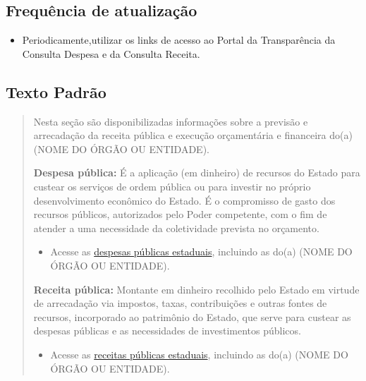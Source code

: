\documentclass[
]{book}
\providecommand{\tightlist}{%
  \setlength{\itemsep}{0pt}\setlength{\parskip}{0pt}}
\begin{document}
\hypertarget{frequuxeancia-de-atualizauxe7uxe3o-4}{%
\subsection{Frequência de atualização}\label{frequuxeancia-de-atualizauxe7uxe3o-4}}

\begin{itemize}
\tightlist
\item
  Periodicamente,utilizar os links de acesso ao Portal da Transparência da Consulta Despesa e da Consulta Receita.
\end{itemize}

\hypertarget{texto-padruxe3o-5}{%
\subsection{Texto Padrão}\label{texto-padruxe3o-5}}

\begin{quote}
Nesta seção são disponibilizadas informações sobre a previsão e arrecadação da receita pública e execução orçamentária e financeira do(a) (NOME DO ÓRGÃO OU ENTIDADE).

\textbf{Despesa pública:} É a aplicação (em dinheiro) de recursos do Estado para custear os serviços de ordem pública ou para investir no próprio desenvolvimento econômico do Estado. É o compromisso de gasto dos recursos públicos, autorizados pelo Poder competente, com o fim de atender a uma necessidade da coletividade prevista no orçamento.

\begin{itemize}
\tightlist
\item
  Acesse as \href{http://www.transparencia.mg.gov.br/despesa-estado/despesa}{despesas públicas estaduais}, incluindo as do(a) (NOME DO ÓRGÃO OU ENTIDADE).
\end{itemize}

\textbf{Receita pública:} Montante em dinheiro recolhido pelo Estado em virtude de arrecadação via impostos, taxas, contribuições e outras fontes de recursos, incorporado ao patrimônio do Estado, que serve para custear as despesas públicas e as necessidades de investimentos públicos.

\begin{itemize}
\tightlist
\item
  Acesse as \href{http://www.transparencia.mg.gov.br/estado-receita}{receitas públicas estaduais}, incluindo as do(a) (NOME DO ÓRGÃO OU ENTIDADE).
\end{itemize}
\end{quote}
\end{document}
